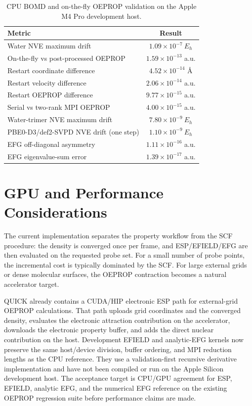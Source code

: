 \documentclass[journal=jctcce,manuscript=article,email=false]{achemso}
\newcommand{\quick}{QUICK}
\begin{document}
\begin{table}[htbp]
\centering
\caption{CPU BOMD and on-the-fly OEPROP validation on the Apple M4 Pro development host.}
\begin{tabular}{lc}
\toprule
Metric & Result \\
\midrule
Water NVE maximum drift & \(1.09\times10^{-7}\ E_h\) \\
On-the-fly vs post-processed OEPROP & \(1.59\times10^{-13}\) a.u. \\
Restart coordinate difference & \(4.52\times10^{-14}\) \AA{} \\
Restart velocity difference & \(2.06\times10^{-14}\) a.u. \\
Restart OEPROP difference & \(9.77\times10^{-15}\) a.u. \\
Serial vs two-rank MPI OEPROP & \(4.00\times10^{-15}\) a.u. \\
Water-trimer NVE maximum drift & \(7.80\times10^{-9}\ E_h\) \\
PBE0-D3/def2-SVPD NVE drift (one step) & \(1.10\times10^{-9}\ E_h\) \\
EFG off-diagonal asymmetry & \(1.11\times10^{-16}\) a.u. \\
EFG eigenvalue-sum error & \(1.39\times10^{-17}\) a.u. \\
\bottomrule
\end{tabular}
\label{tab:bomd_validation}
\end{table}

\section{GPU and Performance Considerations}

The current implementation separates the property workflow from the SCF
procedure: the density is converged once per frame, and ESP/EFIELD/EFG are
then evaluated on the requested probe set.  For a small number of probe
points, the incremental cost is typically dominated by the SCF.  For large
external grids or dense molecular surfaces, the OEPROP contraction becomes
a natural accelerator target.

\quick{} already contains a CUDA/HIP electronic ESP path for external-grid
OEPROP calculations.  That path uploads grid coordinates and the converged
density, evaluates the electronic attraction contribution on the
accelerator, downloads the electronic property buffer, and adds the direct
nuclear contribution on the host.  Development EFIELD and analytic-EFG
kernels now preserve the same host/device division, buffer ordering, and
MPI reduction lengths as the CPU reference.  They use a validation-first
recursive derivative implementation and have not been compiled or run on
the Apple Silicon development host.  The acceptance target is CPU/GPU
agreement for ESP, EFIELD, analytic EFG, and the numerical EFG reference on
the existing OEPROP regression suite before performance claims are made.
\end{document}
